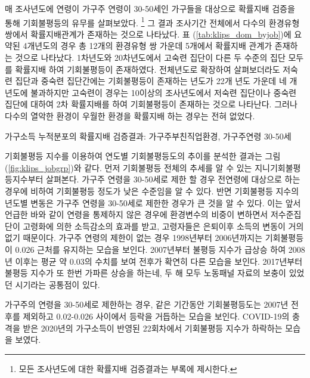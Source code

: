매 조사년도에 연령이 가구주 연령이 30-50세인 가구들을 대상으로 확률지배 검증을 통해 기회불평등의 유무를 살펴보았다.
\footnote{모든 조사년도에 대한 확률지배 검증결과는 부록에 제시한다.}
그 결과 조사기간 전체에서 다수의 환경유형 쌍에서 확률지배관계가 존재하는 것으로 나타났다.
표 (\ref{tab:klips_dom_byjob})에 요약된 4개년도의 경우 총 12개의 환경유형 쌍 가운데 5개에서 확률지배 관계가 존재하는 것으로 나타났다.
1차년도와 20차년도에서 고숙련 집단이 다른 두 수준의 집단 모두를 확률지배 하여 기회불평등이 존재하였다.
전체년도로 확장하여 살펴보더라도 저숙련 집단과 중숙련 집단간에는 기회불평등이 존재하는 년도가 22개 년도 가운데 네 개 년도에 불과하지만 고숙련이 경우는 10이상의 조사년도에서 저숙련 집단이나 중숙련 집단에 대하여 2차 확률지배를 하여 기회불평등이 존재하는 것으로 나타난다.
그러나 다수의 열악한 환경이 우월한 환경을 확률지배 하는 경우는 전혀 없었다.

\begin{table}[htbp]
    \centering
    \caption{가구소득 누적분포의 확률지배 검증결과: 가구주부친직업환경, 가구주연령 30-50세}
    
    \label{tab:klips_dom_byjob}
\end{table}

기회불평등 지수를 이용하여 연도별 기회불평등도의 추이를 분석한 결과는 그림 (\ref{fig:klips_jobgrp})와 같다.
먼저 기회불평등 전체의 추세를 알 수 있는 지니기회불평등지수부터 살펴본다.
가구주 연령을 30-50세로 제한 할 경우 전연령에 대상으로 하는 경우에 비하여 기회불평등 정도가 낮은 수준임을 알 수 있다.
반면 기회불평등 지수의 년도별 변동은 가구주 연령을 30-50세로 제한한 경우가 큰 것을 알 수 있다.
이는 앞서 언급한 바와 같이 연령을 통제하지 않은 경우에 환경변수의 비중이 변하면서 저수준집단이 고령화에 의한 소득감소의 효과를 받고, 고령자들은 은퇴이후 소득의 변동이 거의 없기 때문이다.
가구주 연령의 제한이 없는 경우  1998년부터 2006년까지는 기회불평등이 0.026 근처를 유지하는 모습을 보인다.
2007년부터 불평등 지수가 급상승 하여 2008년 이후는 평균 약 0.03의 수치를 보여 전후가 확연히 다른 모습을 보인다.
2017년부터 불평등 지수가 또 한번 가파른 상승을 하는네, 두 해 모두 노동패널 자료의 보충이 있었던 시기라는 공통점이 있다.

가구주의 연령을 30-50세로 제한하는 경우, 같은 기간동안 기회불평등도는 2007년 전후를 제외하고 0.02-0.026 사이에서 등락을 거듭하는 모습을 보인다.
COVID-19의 충격을 받은 2020년의 가구소득이 반영된 22회차에서 기회불평등 지수가 하락하는 모습을 보였다.
 
